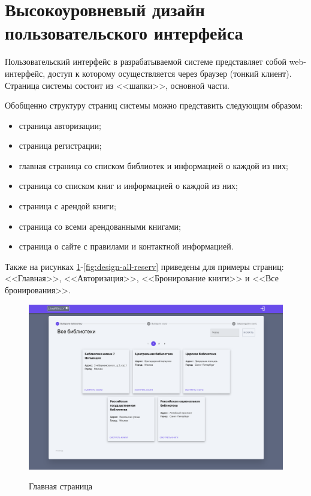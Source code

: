 \section{Высокоуровневый дизайн пользовательского интерфейса}

Пользовательский интерфейс в разрабатываемой системе представляет собой web-интерфейс, доступ к которому осуществляется через браузер (тонкий клиент). Страница системы состоит из <<шапки>>, основной части.  

Обобщенно структуру страниц системы можно представить следующим образом:
\begin{itemize}
  \item страница авторизации;
	\item страница регистрации;
	\item главная страница со списком библиотек и информацией о каждой из них;
	\item страница со списком книг и информацией о каждой из них;
	\item страница с арендой книги;
	\item страница со всеми арендованными книгами;
	\item страница о сайте с правилами и контактной информацией.
\end{itemize}

Также на рисунках \ref{fig:design-main}-\ref{fig:design-all-reserv} приведены для примеры страниц: <<Главная>>, <<Авторизация>>, <<Бронирование книги>> и <<Все бронирования>>.

\begin{figure}[H]
	\begin{center}
		{\includegraphics[scale = 0.25]{../img/design/main.png}}
		\caption{Главная страница}
		\label{fig:design-main}
	\end{center}
\end{figure}

